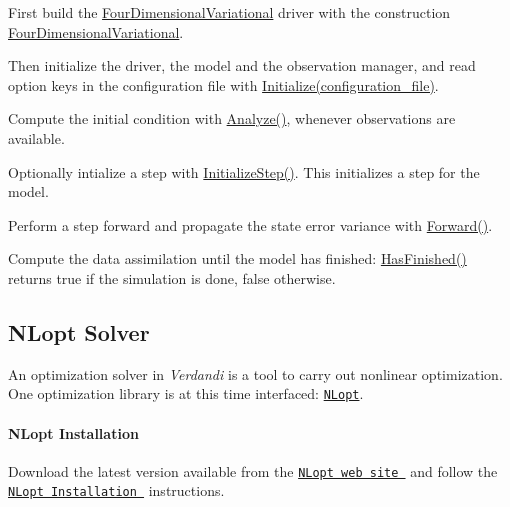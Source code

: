 \documentclass{tufte-book}
\begin{document}
\begin{DoxyEnumerate}
\item \-First build the {\ttfamily  \hyperlink{class_verdandi_1_1_four_dimensional_variational}{\-Four\-Dimensional\-Variational}} driver with the construction {\ttfamily  \hyperlink{class_verdandi_1_1_four_dimensional_variational_ae14f6f280b12bb02e4440e5b08513ab7}{\-Four\-Dimensional\-Variational}}.


\item \-Then initialize the driver, the model and the observation manager, and read option keys in the configuration file with {\ttfamily  \hyperlink{class_verdandi_1_1_four_dimensional_variational_ae957a078f20e349479b7c823850e975b}{\-Initialize(configuration\-\_\-file)}}.


\item \-Compute the initial condition with {\ttfamily  \hyperlink{class_verdandi_1_1_four_dimensional_variational_a746e6da7fbc0cb815ef10a790c87e42b}{\-Analyze()}}, whenever observations are available.


\item \-Optionally intialize a step with {\ttfamily  \hyperlink{class_verdandi_1_1_four_dimensional_variational_a8171f91eeb3ff4ed62c37d92d285148d}{\-Initialize\-Step()}}. \-This initializes a step for the model.


\item \-Perform a step forward and propagate the state error variance with {\ttfamily  \hyperlink{class_verdandi_1_1_four_dimensional_variational_a562aa63b8f14856831f0a39e573c10ad}{\-Forward()}}.


\item \-Compute the data assimilation until the model has finished\-: {\ttfamily  \hyperlink{class_verdandi_1_1_four_dimensional_variational_ae1c4dd6b21f14e5ad157f9ce6699069c}{\-Has\-Finished()}} returns true if the simulation is done, false otherwise.
\end{DoxyEnumerate}


\hypertarget{optimization_solver_nlopt}{}\subsection{\-N\-Lopt Solver}\label{optimization_solver_nlopt}

\-An optimization solver in \-\emph{Verdandi} is a tool to carry out nonlinear optimization. \-One optimization library is at this time interfaced\-: \href{http://ab-initio.mit.edu/wiki/index.php/NLopt}{\tt \-N\-Lopt}.
\hypertarget{optimization_solver_nlopt_installation}{}\paragraph{\-N\-Lopt Installation}\label{optimization_solver_nlopt_installation}
\-Download the latest version available from the \href{http://ab-initio.mit.edu/wiki/index.php/NLopt#Download_and_installation}{\tt \-N\-Lopt web site } and follow the \href{http://ab-initio.mit.edu/wiki/index.php/NLopt_Installation}{\tt \-N\-Lopt \-Installation } instructions.
\end{document}
